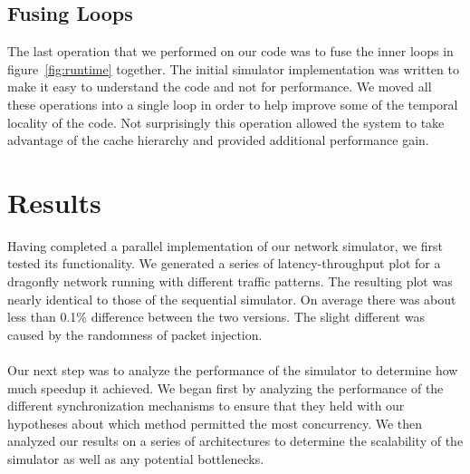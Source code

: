 \documentclass[twocolumn]{article}
\begin{document}
\subsection{Fusing Loops}
The last operation that we performed on our code was to fuse the inner loops in figure~\ref{fig:runtime} together.  The initial simulator implementation was written to make it
easy to understand the code and not for performance.  We moved all these operations into a single loop in order to help improve some of the temporal locality of the
code.  Not surprisingly this operation allowed the system to take
advantage of the cache hierarchy and provided additional performance gain.

\section{Results \label{results}}
Having completed a parallel implementation of our network simulator, we first tested its functionality. We generated a series of latency-throughput plot for a dragonfly network running with different traffic patterns. The resulting plot was nearly identical to those of the sequential simulator. On average there was about less than 0.1\% difference between the two versions. The slight different was caused by the randomness of packet injection. \\
~\\
 Our next step was to analyze the performance of the simulator to determine how
much speedup it achieved.  We began first by analyzing the performance of
the different synchronization mechanisms to ensure that they held with our
hypotheses about which method permitted the most concurrency.  We then analyzed
our results on a series of architectures to determine the scalability of
the simulator as well as any potential bottlenecks.
\end{document}
